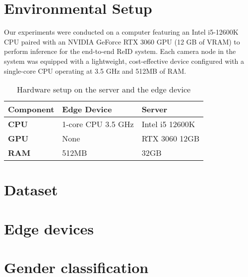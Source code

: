 \documentclass[../main.tex]{subfiles}
\begin{document}
\section{Environmental Setup}
\label{sec:environmental_setup}

Our experiments were conducted on a computer featuring an Intel i5-12600K CPU paired with an NVIDIA GeForce RTX 3060 GPU (12 GB of VRAM) to perform inference for the end-to-end ReID system. Each camera node in the system was equipped with a lightweight, cost-effective device configured with a single-core CPU operating at 3.5 GHz and 512MB of RAM.

\begin{table}[h]
\centering
\caption{Hardware setup on the server and the edge device}
\label{tab:hardware_setup}
\begin{tabular}{|p{3.5cm}|p{5cm}|p{5cm}|}
\hline
\textbf{Component} & \textbf{Edge Device} & \textbf{Server} \\
\hline
\textbf{CPU} & 1-core CPU 3.5 GHz & Intel i5 12600K \\
\hline
\textbf{GPU} & None & RTX 3060 12GB \\
\hline
\textbf{RAM} & 512MB & 32GB \\
\hline
\end{tabular}
\end{table}

\section{Dataset}
\label{sec:dataset}


\section{Edge devices}
\label{sec:edge_devices_experiments}


\section{Gender classification}
\label{sec:classification_experiments}
\end{document}
